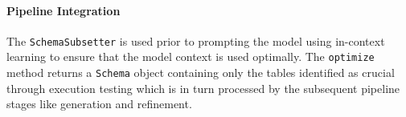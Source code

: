 \paragraph{Pipeline Integration}

The \texttt{SchemaSubsetter} is used prior to prompting the model using
in-context learning to ensure that the model context is used optimally.
The \texttt{optimize} method returns a \texttt{Schema} object
containing only the tables identified as crucial through execution testing
which is in turn processed by the subsequent pipeline stages like generation
and refinement.

